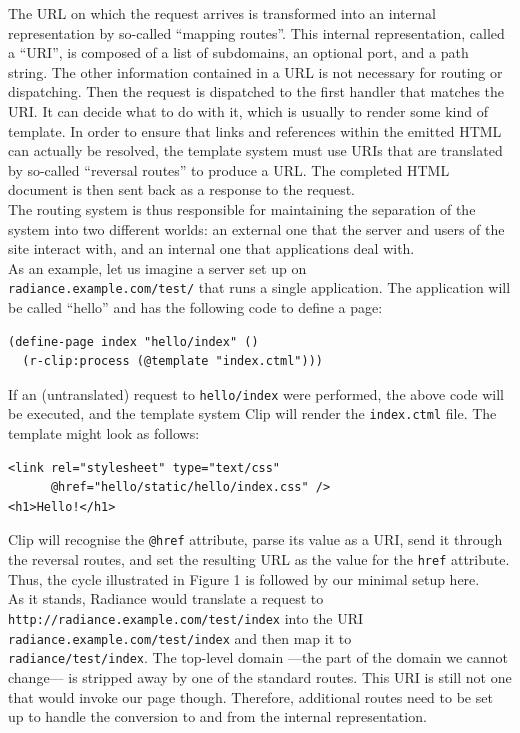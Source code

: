 \documentclass{sig-alternate}
\begin{document}
The URL on which the request arrives is transformed into an internal representation by so-called ``mapping routes''. This internal representation, called a ``URI'', is composed of a list of subdomains, an optional port, and a path string. The other information contained in a URL is not necessary for routing or dispatching. Then the request is dispatched to the first handler that matches the URI. It can decide what to do with it, which is usually to render some kind of template. In order to ensure that links and references within the emitted HTML can actually be resolved, the template system must use URIs that are translated by so-called ``reversal routes'' to produce a URL. The completed HTML document is then sent back as a response to the request. \\

The routing system is thus responsible for maintaining the separation of the system into two different worlds: an external one that the server and users of the site interact with, and an internal one that applications deal with. \\

As an example, let us imagine a server set up on \\ \texttt{radiance.example.com/test/} that runs a single application. The application will be called ``hello'' and has the following code to define a page:

\begin{verbatim}
(define-page index "hello/index" ()
  (r-clip:process (@template "index.ctml")))
\end{verbatim}

If an (untranslated) request to \texttt{hello/index} were performed, the above code will be executed, and the template system Clip\cite{clip} will render the \texttt{index.ctml} file. The template might look as follows:

\begin{verbatim}
<link rel="stylesheet" type="text/css"
      @href="hello/static/hello/index.css" />
<h1>Hello!</h1>
\end{verbatim}

Clip will recognise the \texttt{@href} attribute, parse its value as a URI, send it through the reversal routes, and set the resulting URL as the value for the \texttt{href} attribute. Thus, the cycle illustrated in Figure 1 is followed by our minimal setup here. \\

As it stands, Radiance would translate a request to \\\texttt{http://radiance.example.com/test/index} into the URI \\\texttt{radiance.example.com/test/index} and then map it to \\\texttt{radiance/test/index}. The top-level domain ---the part of the domain we cannot change--- is stripped away by one of the standard routes. This URI is still not one that would invoke our page though. Therefore, additional routes need to be set up to handle the conversion to and from the internal representation.
\end{document}
